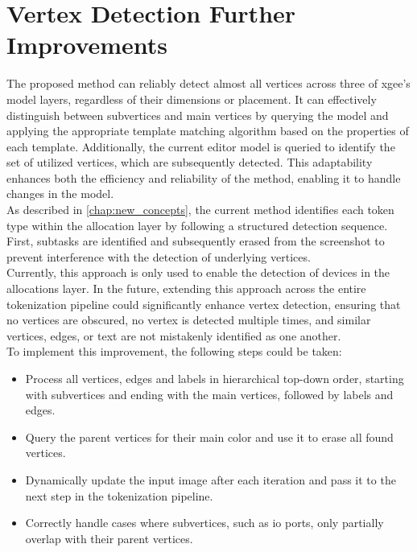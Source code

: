 \section{Vertex Detection Further Improvements}
\label{sec:vertex_detection_further_improvements}
The proposed method can reliably detect almost all vertices across three of \acrshort{xgee}'s model layers, regardless of their dimensions or placement. It can effectively distinguish between subvertices and main vertices by querying the model and applying the appropriate template matching algorithm based on the properties of each template. Additionally, the current editor model is queried to identify the set of utilized vertices, which are subsequently detected. This adaptability enhances both the efficiency and reliability of the method, enabling it to handle changes in the model.\\
As described in \autoref{chap:new_concepts}, the current method identifies each token type within the allocation layer by following a structured detection sequence. First, subtasks are identified and subsequently erased from the screenshot to prevent interference with the detection of underlying vertices.\\
Currently, this approach is only used to enable the detection of devices in the allocations layer. In the future, extending this approach across the entire tokenization pipeline could significantly enhance vertex detection, ensuring that no vertices are obscured, no vertex is detected multiple times, and similar vertices, edges, or text are not mistakenly identified as one another.\\
To implement this improvement, the following steps could be taken:

\begin{itemize}
    \item Process all vertices, edges and labels in hierarchical top-down order, starting with subvertices and ending with the main vertices, followed by labels and edges.
    \item Query the parent vertices for their main color and use it to erase all found vertices.
    \item Dynamically update the input image after each iteration and pass it to the next step in the tokenization pipeline.
    \item Correctly handle cases where subvertices, such as \acrshort{io} ports, only partially overlap with their parent vertices.
\end{itemize}

